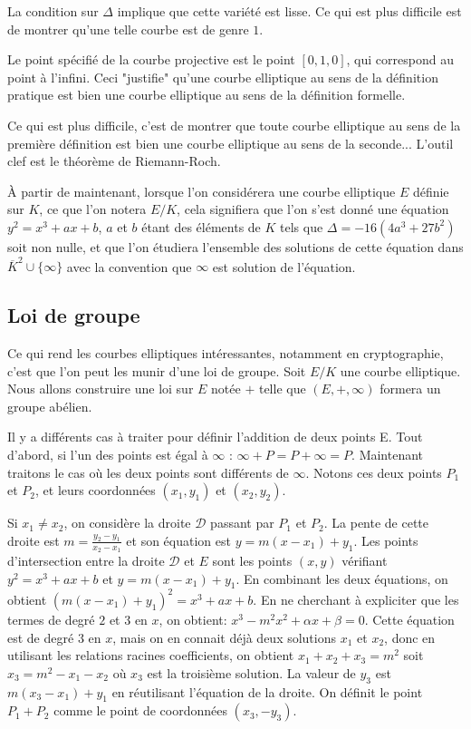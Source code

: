 \documentclass{article}
\theoremstyle{plain}%
\theoremstyle{definition}%
\newcommand{\ol}{\overline}
\begin{document}
La condition sur $\Delta$ implique que cette variété est lisse. Ce qui est plus difficile est de montrer  qu'une telle courbe est de genre $1$. 

Le point spécifié de la courbe projective est le point $[0, 1, 0]$, qui correspond au point à l'infini. Ceci "justifie" qu'une courbe elliptique au sens de la définition pratique est bien une courbe elliptique au sens de la définition formelle. 

Ce qui est plus difficile, c'est de montrer que toute courbe elliptique au sens de la première définition est bien une courbe elliptique au sens de la seconde... L'outil clef est le théorème de Riemann-Roch.

\vspace{0.5em}
À partir de maintenant, lorsque l'on considérera une courbe elliptique $E$ définie sur $K$, ce que l'on notera $E/K$, cela signifiera que l'on s'est donné une équation $y^2 = x^3 + ax + b$, $a$ et $b$ étant des éléments de $K$ tels que $\Delta =-16(4a^3+ 27b^2)$ soit non nulle, et que l'on étudiera l'ensemble des solutions de cette équation dans $\ol K^2\cup \{\infty\}$ avec la convention que $\infty$ est solution de l'équation.


\subsection{Loi de groupe}

Ce qui rend les courbes elliptiques intéressantes, notamment en cryptographie, c'est que l'on peut les munir d'une loi de groupe. Soit $E/K$ une courbe elliptique. Nous allons construire une loi sur $E$ notée $+$ telle que $(E, +, \infty)$ formera un groupe abélien.

Il y a différents cas à traiter pour définir l'addition de deux points E.
Tout d'abord, si l'un des points est égal à $\infty$ : $\infty+P = P+\infty = P$.
Maintenant traitons le cas où les deux points sont différents de $\infty$. Notons ces deux points $P_1$ et $P_2$, et leurs coordonnées $(x_1, y_1)$ et $(x_2, y_2)$.

Si $x_1\neq x_2$, on considère la droite $\mathcal D$ passant par $P_1$ et $P_2$. La pente de cette droite est $m = \frac{y_2-y_1}{x_2-x_1}$ et son équation est $y = m(x-x_1) + y_1$. Les points d'intersection entre la droite $\mathcal D$ et $E$ sont les points $(x, y)$ vérifiant $y^2 = x^3 + ax + b$ et $y = m(x-x_1) + y_1$. En combinant les deux équations, on obtient $(m(x-x_1) + y_1)^2 =  x^3 + ax + b$. 
En ne cherchant à expliciter que les termes de degré $2$ et $3$ en $x$, on obtient: $ x^3 -m^2x^2 + \alpha x + \beta = 0$. 
Cette équation est de degré $3$ en $x$, mais on en connait déjà  deux solutions $x_1$ et $x_2$, donc en utilisant les relations racines coefficients, on obtient $x_1+x_2+x_3 = m^2$ soit $x_3 = m^2 - x_1 - x_2$ où $x_3$ est la troisième solution. La valeur de $y_3$ est $m(x_3-x_1)+y_1$ en réutilisant l'équation de la droite. On définit le point $P_1 + P_2$ comme le point de coordonnées $(x_3, -y_3)$.
\end{document}
